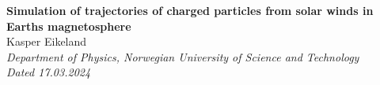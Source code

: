 
\begin{center}
{ \huge \bfseries Simulation of trajectories of charged particles from solar winds in Earths magnetosphere}\\[0.4cm]
{\large  Kasper Eikeland} \\[0.4cm]
\textit{Department of Physics, Norwegian University of Science and Technology} \\
{ \textit{Dated 17.03.2024}}
\end{center}

